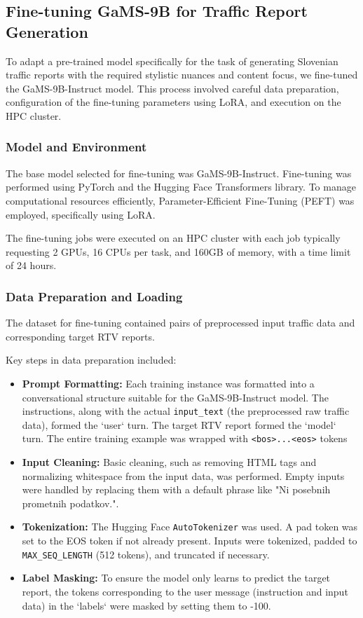\documentclass[fleqn,moreauthors,10pt]{ds_report}
\begin{document}
\subsection*{Fine-tuning GaMS-9B for Traffic Report Generation}
To adapt a pre-trained model specifically for the task of generating Slovenian traffic reports with the required stylistic nuances and content focus, we fine-tuned the GaMS-9B-Instruct model. This process involved careful data preparation, configuration of the fine-tuning parameters using LoRA, and execution on the HPC cluster.

\subsubsection*{Model and Environment}
The base model selected for fine-tuning was GaMS-9B-Instruct. Fine-tuning was performed using PyTorch and the Hugging Face Transformers library. To manage computational resources efficiently, Parameter-Efficient Fine-Tuning (PEFT) was employed, specifically using LoRA.

The fine-tuning jobs were executed on an HPC cluster with each job typically requesting 2 GPUs, 16 CPUs per task, and 160GB of memory, with a time limit of 24 hours.

\subsubsection*{Data Preparation and Loading}
The dataset for fine-tuning contained pairs of preprocessed input traffic data and corresponding target RTV reports.

Key steps in data preparation included:
\begin{itemize}
    \item \textbf{Prompt Formatting:} Each training instance was formatted into a conversational structure suitable for the GaMS-9B-Instruct model. The instructions, along with the actual \texttt{input\_text} (the preprocessed raw traffic data), formed the `user` turn. The target RTV report formed the `model` turn. The entire training example was wrapped with \texttt{<bos>...<eos>} tokens
    \item \textbf{Input Cleaning:} Basic cleaning, such as removing HTML tags and normalizing whitespace from the input data, was performed. Empty inputs were handled by replacing them with a default phrase like "Ni posebnih prometnih podatkov.".
    \item \textbf{Tokenization:} The Hugging Face \texttt{AutoTokenizer} was used. A pad token was set to the EOS token if not already present. Inputs were tokenized, padded to \texttt{MAX\_SEQ\_LENGTH} (512 tokens), and truncated if necessary.
    \item \textbf{Label Masking:} To ensure the model only learns to predict the target report, the tokens corresponding to the user message (instruction and input data) in the `labels` were masked by setting them to -100.
\end{itemize}
\end{document}
